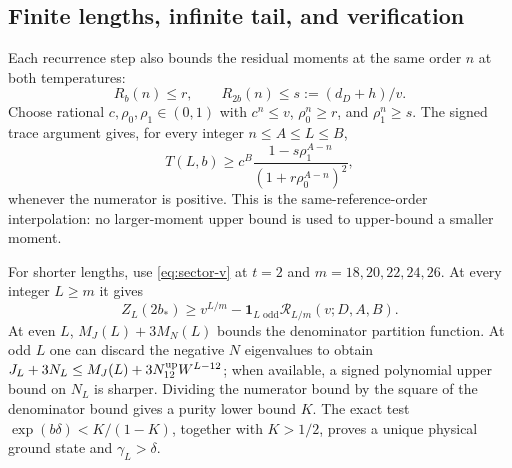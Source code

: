 \documentclass[11pt,a4paper]{article}
\newcommand{\gap}{\gamma}
\begin{document}
\subsection{Finite lengths, infinite tail, and verification}
Each recurrence step also bounds the residual moments at the same
order $n$ at both temperatures:
\[
 R_b(n)\le r,\qquad R_{2b}(n)\le s:=(d_D+h)/v.
\]
Choose rational $c,\rho_0,\rho_1\in(0,1)$ with
$c^n\le v$, $\rho_0^n\ge r$, and $\rho_1^n\ge s$.
The signed trace argument gives, for every integer $n\le A\le L\le B$,
\begin{equation}\label{eq:sector-interval}
 T(L,b)\ge c^B
 \frac{1-s\rho_1^{A-n}}{(1+r\rho_0^{A-n})^2},
\end{equation}
whenever the numerator is positive. This is the same-reference-order
interpolation: no larger-moment upper bound is used to upper-bound a
smaller moment.

For shorter lengths, use \eqref{eq:sector-v} at $t=2$ and
$m=18,20,22,24,26$. At every integer $L\ge m$ it gives
\[
 Z_L(2b_*)\ge v^{L/m}
 -\mathbf1_{L\text{ odd}}\mathcal R_{L/m}(v;D,A,B).
\]
At even $L$, $M_J(L)+3M_N(L)$ bounds the denominator partition function.
At odd $L$ one can discard the negative $N$ eigenvalues to obtain
$J_L+3N_L\le M_J(L)+3N_{12}^{\rm up}W^{L-12}$; when available, a
signed polynomial upper bound on $N_L$ is sharper. Dividing the
numerator bound by the square of the denominator bound gives a
purity lower bound $K$. The exact test
$\exp(b\delta)<K/(1-K)$, together with $K>1/2$, proves a unique
physical ground state and $\gap_L>\delta$.
\end{document}

